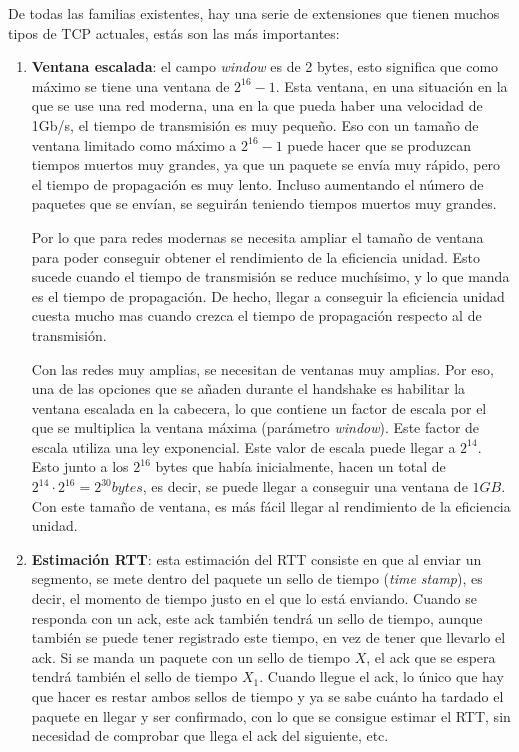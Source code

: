 \documentclass[10pt,a4paper,spanish]{report}
\begin{document}
De todas las familias existentes, hay una serie de extensiones que tienen muchos tipos de TCP actuales, estás son las más importantes:

\begin{enumerate}[\textcolor{tema3}{$\bullet$}]
  \item \textbf{\textcolor{tema3}{Ventana escalada}}: el campo \textit{\textcolor{tema3}{window}} es de 2 bytes, esto significa que como máximo se tiene una ventana de $2^{16}-1$. Esta ventana, en una situación en la que se use una red moderna, una en la que pueda haber una velocidad de 1Gb/s, el tiempo de transmisión es muy pequeño. Eso con un tamaño de ventana limitado como máximo a $2^{16}-1$ puede hacer que se produzcan tiempos muertos muy grandes, ya que un paquete se envía muy rápido, pero el tiempo de propagación es muy lento. Incluso aumentando el número de paquetes que se envían, se seguirán teniendo tiempos muertos muy grandes. 

  Por lo que para redes modernas se necesita ampliar el tamaño de ventana para poder conseguir obtener el rendimiento de la eficiencia unidad. Esto sucede cuando el tiempo de transmisión se reduce muchísimo, y lo que manda es el tiempo de propagación. De hecho, llegar a conseguir la eficiencia unidad cuesta mucho mas cuando crezca el tiempo de propagación respecto al de transmisión. 

  Con las redes muy amplias, se necesitan de ventanas muy amplias. Por eso, una de las opciones que se añaden durante el handshake es habilitar la ventana escalada en la cabecera, lo que contiene un factor de escala por el que se multiplica la ventana máxima (parámetro \textcolor{tema3}{\textit{window}}). Este factor de escala utiliza una ley exponencial. Este valor de escala puede llegar a $2^{14}$. Esto junto a los $2^{16}$ bytes que había inicialmente, hacen un total de $2^{14}\cdot2^{16}=2^{30}bytes$, es decir, se puede llegar a conseguir una ventana de $1GB$. Con este tamaño de ventana, es más fácil llegar al rendimiento de la eficiencia unidad.

  \item \textbf{\textcolor{tema3}{Estimación RTT}}: esta estimación del RTT consiste en que al enviar un segmento, se mete dentro del paquete un sello de tiempo (\textit{\textcolor{tema3}{time stamp}}), es decir, el momento de tiempo justo en el que lo está enviando. Cuando se responda con un ack, este ack también tendrá un sello de tiempo, aunque también se puede tener registrado este tiempo, en vez de tener que llevarlo el ack. Si se manda un paquete con un sello de tiempo $X$, el ack que se espera tendrá también el sello de tiempo $X_1$. Cuando llegue el ack, lo único que hay que hacer es restar ambos sellos de tiempo y ya se sabe cuánto ha tardado el paquete en llegar y ser confirmado, con lo que se consigue estimar el RTT, sin necesidad de comprobar que llega el ack del siguiente, etc.


\end{enumerate}
\end{document}
